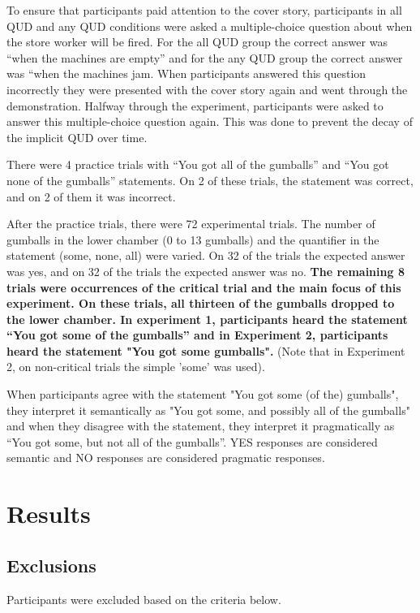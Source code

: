 \documentclass[12pt]{article}
\begin{document}
To ensure that participants paid attention to the cover story, participants in all QUD and any QUD conditions were asked a multiple-choice question about when the store worker will be fired. For the all QUD group the correct answer was “when the machines are empty” and for the any QUD group the correct answer was “when the machines jam. When participants answered this question incorrectly they were presented with the cover story again and went through the demonstration. Halfway through the experiment, participants were asked to answer this multiple-choice question again. This was done to prevent the decay of the implicit QUD over time. 

There were 4 practice trials with “You got all of the gumballs” and “You got none of the gumballs” statements. On 2 of these trials, the statement was correct, and on 2 of them it was incorrect. 

After the practice trials, there were 72 experimental trials. The number of gumballs in the lower chamber (0 to 13 gumballs) and the quantifier in the statement (some, none, all) were varied. On 32 of the trials the expected answer was yes, and on 32 of the trials the expected answer was no. \textbf{The remaining 8 trials were occurrences of the critical trial and the main focus of this experiment. On these trials, all thirteen of the gumballs dropped to the lower chamber. In experiment 1, participants heard the statement “You got some of the gumballs” and in Experiment 2, participants heard the statement "You got some gumballs".} (Note that in Experiment 2, on non-critical trials the simple 'some' was used). 

When participants agree with the statement "You got some (of the) gumballs", they interpret it semantically as "You got some, and possibly all of the gumballs" and when they disagree with the statement, they interpret it pragmatically as “You got some, but not all of the gumballs”. YES responses are considered semantic and NO responses are considered pragmatic responses.


\pagebreak
\section{Results}

\subsection*{Exclusions}
Participants were excluded based on the criteria below. 
\end{document}
